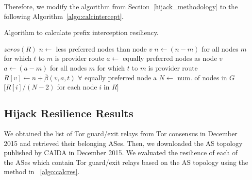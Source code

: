 Therefore, we modify the algorithm from Section~\ref{hijack_methodology} to the following Algorithm~\ref{algo:calcintercept}. 

\begin{algorithm}
\caption{Algorithm to calculate prefix interception resiliency.}
\label{algo:calcintercept}
\begin{algorithmic}
    \State {}
    \State $zeros(R)$
		\State $n \gets$ less preferred nodes than node $v$
			\State $n \gets (n - m)$ for all nodes $m$ for which $t$ to $m$ is provider route
		\EndIf
		\State $a \gets$ equally preferred nodes as node $v$
			\State $a \gets (a - m)$ for all nodes $m$ for which $t$ to $m$ is provider route
		\EndIf
		\State $R[v] \gets n + \bar{\beta}(v,a,t)$ $\forall$ equally preferred node a
	\EndIf
    \EndFor
    \State $N \gets$ num. of nodes in $G$
    \State \Return $[R[i] / (N-2)$ for each node $i$ in $R]$
\EndFunction
\end{algorithmic}
\end{algorithm}


\subsection{Hijack Resilience Results}

We obtained the list of Tor guard/exit relays from Tor consensus in December 2015 and retrieved their belonging ASes. Then, we downloaded the AS topology published by CAIDA in December 2015. We evaluated the resilience of each of the ASes which contain Tor guard/exit relays based on the AS topology using the method in ~\ref{algo:calcres}. 

